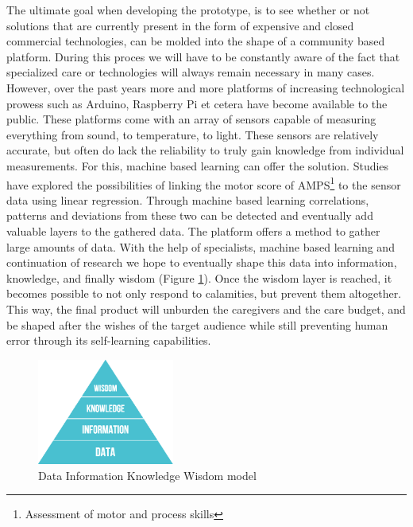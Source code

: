 \documentclass{below-ext}
\begin{document}
The ultimate goal when developing the prototype, is to see whether or not solutions that are currently present in the form of expensive and closed commercial technologies, can be molded into the shape of a community based platform. During this proces we will have to be constantly aware of the fact that specialized care or technologies will always remain necessary in many cases. However, over the past years more and more platforms of increasing technological prowess such as Arduino, Raspberry Pi et cetera have become available to the public. These platforms come with an array of sensors capable of measuring everything from sound, to temperature, to light. These sensors are relatively accurate, but often do lack the reliability to truly gain knowledge from individual measurements. For this, machine based learning can offer the solution. Studies have explored the possibilities of linking the motor score of AMPS\footnote{Assessment of motor and process skills} to the sensor data using linear regression\cite{robben2012grandma}. Through machine based learning correlations, patterns and deviations from these two can be detected and eventually add valuable layers to the gathered data. The platform offers a method to gather large amounts of data. With the help of specialists, machine based learning and continuation of research we hope to eventually shape this data into information, knowledge, and finally wisdom (Figure \ref{fig:dikw}). Once the wisdom layer is reached, it becomes possible to not only respond to calamities, but prevent them altogether. This way, the final product will unburden the caregivers and the care budget, and  be shaped after the wishes of the target audience  while still preventing human error through its self-learning capabilities.

\begin{figure}
\centering
\includegraphics[width=0.4\textwidth]{dikw}
\caption{Data Information Knowledge Wisdom model}
\label{fig:dikw}
\end{figure}

\end{document}
